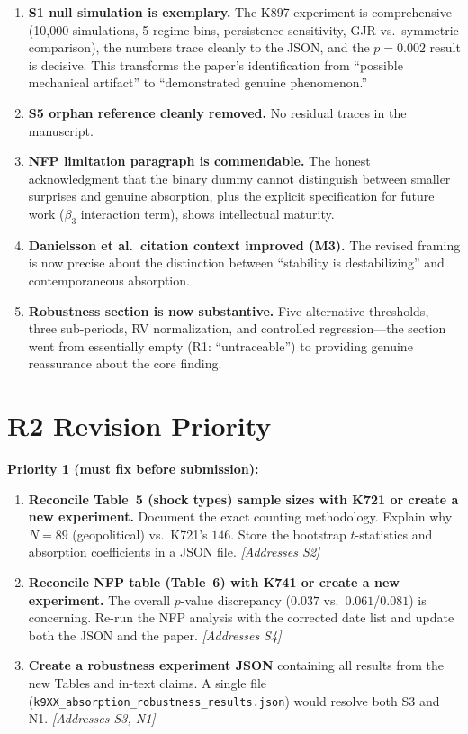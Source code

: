 \documentclass[12pt,a4paper]{article}
\begin{document}
\begin{enumerate}
\item \textbf{S1 null simulation is exemplary.} The K897 experiment is comprehensive (10,000 simulations, 5 regime bins, persistence sensitivity, GJR vs.\ symmetric comparison), the numbers trace cleanly to the JSON, and the $p = 0.002$ result is decisive. This transforms the paper's identification from ``possible mechanical artifact'' to ``demonstrated genuine phenomenon.''

\item \textbf{S5 orphan reference cleanly removed.} No residual traces in the manuscript.

\item \textbf{NFP limitation paragraph is commendable.} The honest acknowledgment that the binary dummy cannot distinguish between smaller surprises and genuine absorption, plus the explicit specification for future work ($\beta_3$ interaction term), shows intellectual maturity.

\item \textbf{Danielsson et al.\ citation context improved (M3).} The revised framing is now precise about the distinction between ``stability is destabilizing'' and contemporaneous absorption.

\item \textbf{Robustness section is now substantive.} Five alternative thresholds, three sub-periods, RV normalization, and controlled regression---the section went from essentially empty (R1: ``untraceable'') to providing genuine reassurance about the core finding.
\end{enumerate}


\bigskip

\section*{R2 Revision Priority}

\textbf{Priority 1 (must fix before submission):}
\begin{enumerate}
\item \textbf{Reconcile Table~5 (shock types) sample sizes with K721 or create a new experiment.} Document the exact counting methodology. Explain why $N = 89$ (geopolitical) vs.\ K721's $146$. Store the bootstrap $t$-statistics and absorption coefficients in a JSON file. \textit{[Addresses S2]}

\item \textbf{Reconcile NFP table (Table~6) with K741 or create a new experiment.} The overall $p$-value discrepancy ($0.037$ vs.\ $0.061$/$0.081$) is concerning. Re-run the NFP analysis with the corrected date list and update both the JSON and the paper. \textit{[Addresses S4]}

\item \textbf{Create a robustness experiment JSON} containing all results from the new Tables and in-text claims. A single file (\texttt{k9XX\_absorption\_robustness\_results.json}) would resolve both S3 and N1. \textit{[Addresses S3, N1]}
\end{enumerate}
\end{document}
